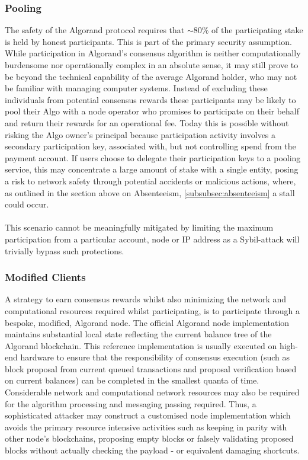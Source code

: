 \documentclass[11pt,a4paper]{article}
\begin{document}
\subsubsection{Pooling}
The safety of the Algorand protocol requires that $\sim$80\% of the participating stake is held by honest participants. 
This is part of the primary security assumption. \\
While participation in Algorand's consensus algorithm is neither computationally burdensome nor operationally complex in 
an absolute sense, it may still prove to be beyond the technical capability of the average Algorand holder, who may not
be familiar with managing computer systems. Instead of excluding these individuals from potential consensus rewards 
these participants may be likely to pool their Algo with a node operator who promises to participate on their behalf and 
return their rewards for an operational fee. Today this is possible without risking the Algo owner’s principal because 
participation activity involves a secondary participation key, associated with, but not controlling spend from the 
payment account. If users choose to delegate their participation keys to a pooling service, this may concentrate a large 
amount of stake with a single entity, posing a risk to network safety through potential accidents or malicious actions, 
where, as outlined in the section above on Absenteeism, \ref{subsubsec:absenteeism} a stall could occur. \\ \\
This scenario cannot be meaningfully mitigated by limiting the maximum participation from a particular account, 
node or IP address as a Sybil-attack will trivially bypass such protections.


\subsubsection{Modified Clients}
A strategy to earn consensus rewards whilst also minimizing the network and computational resources required whilst 
participating, is to participate through a bespoke, modified, Algorand node. The official Algorand node implementation 
maintains substantial local state reflecting the current balance tree of the Algorand blockchain. This reference 
implementation is usually executed on high-end hardware to ensure that the responsibility of consensus execution (such 
as block proposal from current queued transactions and proposal verification based on current balances) can be completed 
in the smallest quanta of time. Considerable network and computational network resources may also be required for the 
algorithm processing and messaging passing required. Thus, a sophisticated attacker may construct a customised node 
implementation which avoids the primary resource intensive activities such as keeping in parity with other node's 
blockchains, proposing empty blocks or falsely validating proposed blocks without actually checking the payload - or 
equivalent damaging shortcuts. 
\end{document}
